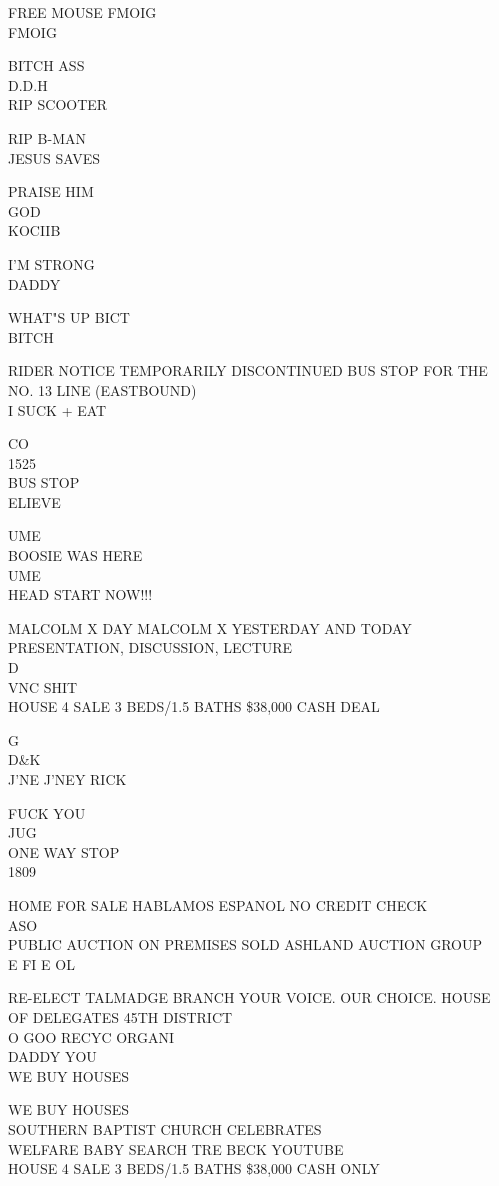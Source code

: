 \documentclass[10pt,letterpaper]{article}
\begin{document}
FREE MOUSE FMOIG\\
FMOIG

BITCH ASS\\
D.D.H\\
RIP SCOOTER

RIP B{-}MAN\\
JESUS SAVES

PRAISE HIM\\
GOD\\
KOCIIB

I'M STRONG\\
DADDY

WHAT"S UP BICT\\
BITCH

RIDER NOTICE TEMPORARILY DISCONTINUED BUS STOP FOR THE NO. 13 LINE (EASTBOUND)\\
I SUCK + EAT

CO\\
1525\\
BUS STOP\\
ELIEVE

UME\\
BOOSIE WAS HERE\\
UME\\
HEAD START NOW!!!

MALCOLM X DAY MALCOLM X YESTERDAY AND TODAY PRESENTATION, DISCUSSION, LECTURE\\
D\\
VNC SHIT\\
HOUSE 4 SALE 3 BEDS/1.5 BATHS \$38,000 CASH DEAL

G\\
D\&K\\
J'NE J'NEY RICK

FUCK YOU\\
JUG\\
ONE WAY STOP\\
1809

HOME FOR SALE HABLAMOS ESPANOL NO CREDIT CHECK\\
ASO\\
PUBLIC AUCTION ON PREMISES SOLD ASHLAND AUCTION GROUP\\
E FI E OL

RE{-}ELECT TALMADGE BRANCH YOUR VOICE.  OUR CHOICE.  HOUSE OF DELEGATES 45TH DISTRICT\\
O GOO RECYC ORGANI\\
DADDY YOU\\
WE BUY HOUSES

WE BUY HOUSES\\
SOUTHERN BAPTIST CHURCH CELEBRATES\\
WELFARE BABY SEARCH TRE BECK YOUTUBE\\
HOUSE 4 SALE 3 BEDS/1.5 BATHS \$38,000 CASH ONLY
\end{document}
